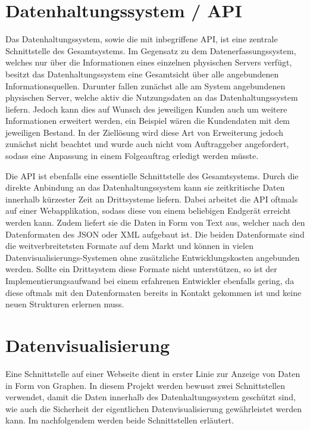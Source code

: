 \section{Datenhaltungssystem / API}
Das Datenhaltungssystem, sowie die mit inbegriffene \gls{API}, ist eine
zentrale Schnittstelle des Gesamtsystems. Im Gegensatz zu dem
Datenerfassungssystem, welches nur über die Informationen eines einzelnen
physischen Servers verfügt, besitzt das Datenhaltungssystem eine Gesamtsicht
über alle angebundenen Informationsquellen. Darunter fallen zunächst alle am
System angebundenen physischen Server, welche aktiv die Nutzungsdaten an das
Datenhaltungssystem liefern. Jedoch kann dies auf Wunsch des jeweiligen Kunden
auch um weitere Informationen erweitert werden, ein Beispiel wären die
Kundendaten mit dem jeweiligen Bestand. In der Ziellösung wird diese Art von
Erweiterung jedoch zunächst nicht beachtet und wurde auch nicht vom
Auftraggeber angefordert, sodass eine Anpassung in einem Folgeauftrag erledigt
werden müsste.

Die \gls{API} ist ebenfalls eine essentielle Schnittstelle des Gesamtsystems.
Durch die direkte Anbindung an das Datenhaltungssystem kann sie zeitkritische
Daten innerhalb kürzester Zeit an Drittsysteme liefern. Dabei arbeitet die
\gls{API} oftmals auf einer Webapplikation, sodass diese von einem beliebigen
Endgerät erreicht werden kann. Zudem liefert sie die Daten in Form von Text
aus, welcher nach den Datenformaten des \gls{JSON} oder \gls{XML} aufgebaut
ist. Die beiden Datenformate sind die weitverbreitetsten Formate auf dem Markt
und können in vielen Datenvisualisierungs\hyp{}Systemen ohne zusätzliche
Entwicklungskosten angebunden werden. Sollte ein Drittsystem diese Formate
nicht unterstützen, so ist der Implementierungsaufwand bei einem erfahrenen
Entwickler ebenfalls gering, da diese oftmals mit den Datenformaten bereits in
Kontakt gekommen ist und keine neuen Strukturen erlernen muss.
\nl%

\section{Datenvisualisierung}
Eine Schnittstelle auf einer Webseite dient in erster Linie zur Anzeige
von Daten in Form von Graphen. In diesem Projekt werden bewusst zwei
Schnittstellen verwendet, damit die Daten innerhalb des Datenhaltungssystem
geschützt sind, wie auch die Sicherheit der eigentlichen Datenvisualisierung
gewährleistet werden kann. Im nachfolgendem werden beide Schnittstellen
erläutert.

